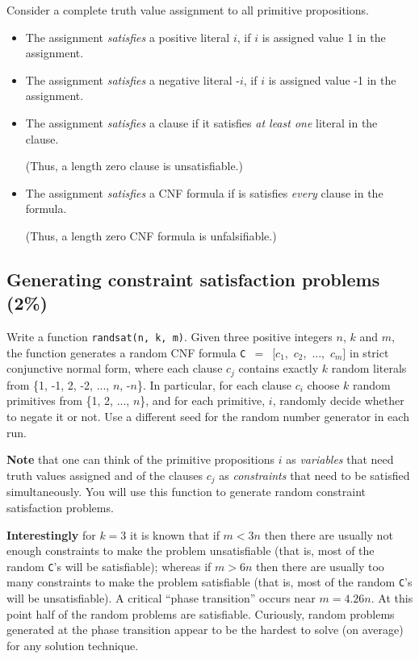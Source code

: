 \documentclass[12pt]{article}
\begin{document}
\bigskip

\noindent
Consider a complete truth value assignment to all primitive propositions.
\begin{itemize}
\item
The assignment {\em satisfies\/} a positive literal $i$,
if $i$ is assigned value 1 in the assignment.
\item
The assignment {\em satisfies\/} a negative literal -$i$,
if $i$ is assigned value -1 in the assignment.
\item
The assignment {\em satisfies\/} a clause if it satisfies
{\em at least one\/} literal in the clause.

(Thus, a length zero clause is unsatisfiable.)
\item
The assignment {\em satisfies\/} a CNF formula if is satisfies
{\em every\/} clause in the formula.

(Thus, a length zero CNF formula is unfalsifiable.)
\end{itemize}

\newpage

\subsection{Generating constraint satisfaction problems \rm(2\%)}
Write a function {\tt randsat(n, k, m)}.
%
Given three positive integers $n$, $k$ and $m$, the function
generates a random CNF formula
\mbox{{\tt C} $=$ [$c_1$, $c_2$, $...$, $c_m$]}
in strict conjunctive normal form,
where each clause $c_j$ contains exactly $k$ random literals
from \{1, -1, 2, -2, ..., $n$, -$n$\}.
In particular, for each clause $c_i$ choose $k$ random primitives
from \{1, 2, ..., $n$\},
and for each primitive, $i$, randomly decide whether to negate it or not.
Use a different seed for the random number generator in each run.

\medskip

\noindent
{\bf Note} that
one can think of the primitive propositions $i$ as {\em variables\/}
that need truth values assigned and of the clauses $c_j$
as {\em constraints\/} that need to be satisfied simultaneously.
You will use this function to generate random constraint satisfaction problems.

\medskip

\noindent
{\bf Interestingly}
for $k=3$ it is known that if $m<3n$ then there are usually not enough
constraints to make the problem unsatisfiable
(that is, most of the random {\tt C}'s will be satisfiable);
whereas if $m>6n$ then there are usually too many constraints
to make the problem satisfiable
(that is, most of the random {\tt C}'s will be unsatisfiable).
A critical ``phase transition'' occurs near $m=4.26n$.
At this point half of the random problems are satisfiable.
Curiously, random problems generated at the phase transition
appear to be the hardest to solve (on average)
for any solution technique.
\end{document}
